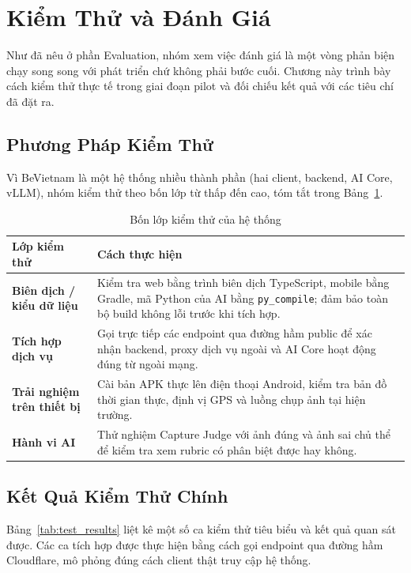 \section{Kiểm Thử và Đánh Giá}

Như đã nêu ở phần Evaluation, nhóm xem việc đánh giá là một vòng phản
biện chạy song song với phát triển chứ không phải bước cuối. Chương này
trình bày cách kiểm thử thực tế trong giai đoạn pilot và đối chiếu kết
quả với các tiêu chí đã đặt ra.

\subsection{Phương Pháp Kiểm Thử}
\contrib

Vì BeVietnam là một hệ thống nhiều thành phần (hai client, backend, AI
Core, vLLM), nhóm kiểm thử theo bốn lớp từ thấp đến cao, tóm tắt trong
Bảng~\ref{tab:test_levels}.

\begin{table}[H]
\centering
\caption{Bốn lớp kiểm thử của hệ thống}
\label{tab:test_levels}
\begin{tabularx}{\textwidth}{>{\raggedright\arraybackslash}p{3.0cm} X}
\toprule
\textbf{Lớp kiểm thử} & \textbf{Cách thực hiện} \\
\midrule
\textbf{Biên dịch / kiểu dữ liệu} & Kiểm tra web bằng trình biên dịch TypeScript, mobile bằng Gradle, mã Python của AI bằng \texttt{py\_compile}; đảm bảo toàn bộ build không lỗi trước khi tích hợp. \\
\textbf{Tích hợp dịch vụ} & Gọi trực tiếp các endpoint qua đường hầm public để xác nhận backend, proxy dịch vụ ngoài và AI Core hoạt động đúng từ ngoài mạng. \\
\textbf{Trải nghiệm trên thiết bị} & Cài bản APK thực lên điện thoại Android, kiểm tra bản đồ thời gian thực, định vị GPS và luồng chụp ảnh tại hiện trường. \\
\textbf{Hành vi AI} & Thử nghiệm Capture Judge với ảnh đúng và ảnh sai chủ thể để kiểm tra xem rubric có phân biệt được hay không. \\
\bottomrule
\end{tabularx}
\end{table}

\subsection{Kết Quả Kiểm Thử Chính}
\contrib

Bảng~\ref{tab:test_results} liệt kê một số ca kiểm thử tiêu biểu và kết
quả quan sát được. Các ca tích hợp được thực hiện bằng cách gọi endpoint
qua đường hầm Cloudflare, mô phỏng đúng cách client thật truy cập hệ thống.

